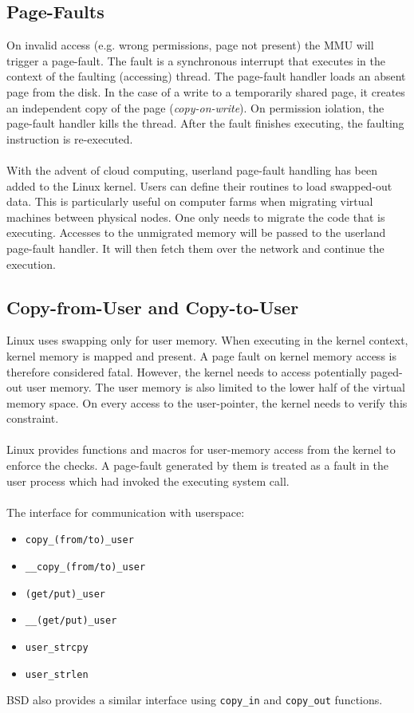 \subsection{Page-Faults}
On invalid access (e.g. wrong permissions, page not present) the MMU will 
trigger a page-fault. The fault is a synchronous interrupt that executes in the 
context of the faulting (accessing) thread. The page-fault handler loads an 
absent page from the disk. In the case of a write to a temporarily shared page,
it creates an independent copy of the page (\emph{copy-on-write}). On permission
iolation, the page-fault handler kills the thread. After the fault finishes
executing, the faulting instruction is re-executed. 
\\
\\
With the advent of cloud computing, userland page-fault handling has been added 
to the Linux kernel. Users can define their routines to load swapped-out data.
This is particularly useful on computer farms when migrating virtual machines
between physical nodes. One only needs to migrate the code that is executing.
Accesses to the unmigrated memory will be passed to the userland page-fault
handler. It will then fetch them over the network and continue the execution.

\subsection{Copy-from-User and Copy-to-User}
Linux uses swapping only for user memory. When executing in the kernel context,
kernel memory is mapped and present. A page fault on kernel memory access is
therefore considered fatal. However, the kernel needs to access potentially
paged-out user memory. The user memory is also limited to the lower half of the
virtual memory space. On every access to the user-pointer, the kernel needs to
verify this constraint.
\\
\\
Linux provides functions and macros for user-memory access from the kernel to 
enforce the checks. A page-fault generated by them is treated as a fault in the
user process which had invoked the executing system call.
\\
\\
The interface for communication with userspace:
\begin{itemize}
    \item[] \texttt{copy\_(from/to)\_user}
    \item[] \texttt{\_\_copy\_(from/to)\_user}
    \item[] \texttt{(get/put)\_user}
    \item[] \texttt{\_\_(get/put)\_user}
    \item[] \texttt{user\_strcpy}
    \item[] \texttt{user\_strlen}
\end{itemize}
\bigskip
BSD also provides a similar interface using \texttt{copy\_in} and 
\texttt{copy\_out} functions.

